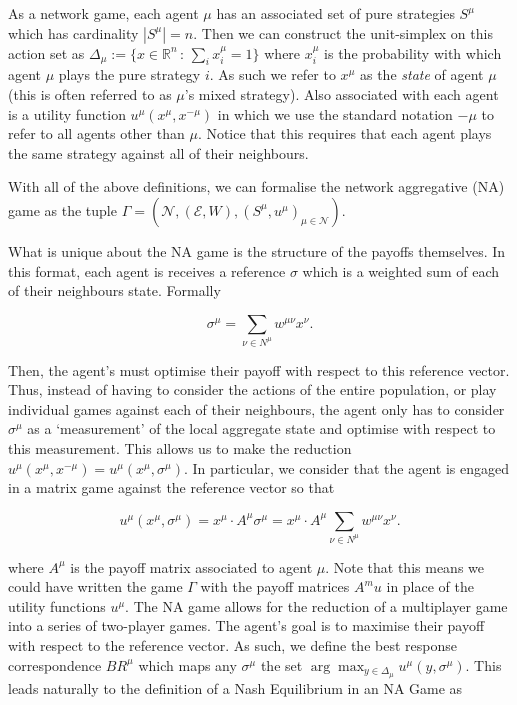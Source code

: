 \documentclass{article}
\theoremstyle{definition}
\newcommand{\agentset}{\mathcal{N}}
\newcommand{\edgeset}{\mathcal{E}}
\newcommand{\weightset}{W}
\newcommand{\actionset}[1]{S^{#1}}
\newcommand{\utility}[1]{u^{#1}}
\newcommand{\wmunu}{w^{\mu \nu}}
\newcommand{\xmu}{x^{\mu}}
\newcommand{\xnu}{x^{\nu}}
\newcommand{\refmu}{\sigma^{\mu}}
\newcommand{\weightedsum}{ \sum_{\nu \in N^\mu} \wmunu \xnu}
\newcommand{\xnotmu}{x^{-\mu}}
\newcommand{\xmuaction}[1]{x^{\mu}_{#1}}
\begin{document}
	As a network game, each agent $\mu$ has an associated set of pure strategies $\actionset{\mu}$
	which has cardinality $|\actionset{\mu}| = n$. Then we can construct the unit-simplex on this
	action set as $\Delta_\mu := \{x \in \mathbb{R}^n \, : \, \sum_i \xmuaction{i} = 1\}$ where
	$\xmuaction{i}$ is the probability with which agent $\mu$ plays the pure strategy $i$. As such
	we refer to $\xmu$ as the \emph{state} of agent $\mu$ (this is often referred to as $\mu$'s
	mixed strategy). Also associated with each agent is a utility function $u^\mu(\xmu, \xnotmu)$ in
	which we use the standard notation $-\mu$ to refer to all agents other than $\mu$. Notice that
	this requires that each agent plays the same strategy against all of their neighbours. 

	With all of the above definitions, we can formalise the network aggregative (NA) game as the tuple
	$\Gamma = (\agentset, (\edgeset, \weightset), (\actionset{\mu}, \utility{\mu})_{\mu \in \mathcal{N}})$.

	What is unique about the NA game is the structure of the payoffs themselves. In this format,
	each agent is receives a reference $\sigma$ which is a weighted sum of each of their
	neighbours state. Formally 

	\begin{equation}
		\sigma^\mu = \sum_{\nu \in N^\mu} \wmunu \xnu.
	\end{equation}

	Then, the agent's must optimise their payoff with respect to this reference vector. Thus,
	instead of having to consider the actions of the entire population, or play individual games
	against each of their neighbours, the agent only has to consider $\sigma^\mu$ as a `measurement'
	of the local aggregate state and optimise with respect to this measurement. This allows us to
	make the reduction $u^\mu(\xmu, \xnotmu) = u^\mu(\xmu, \refmu)$. In particular, we consider that
	the agent is engaged in a matrix game against the reference vector so that

	\begin{equation}
		u^\mu(\xmu, \refmu) = \xmu \cdot A^\mu \refmu = \xmu \cdot A^\mu \weightedsum.
	\end{equation}

	where $A^\mu$ is the payoff matrix associated to agent $\mu$. Note that this means we could have
	written the game $\Gamma$ with the payoff matrices $A^mu$ in place of the utility functions
	$\utility{\mu}$. The NA game allows for the reduction of a
	multiplayer game into a series of two-player games. The agent's goal is to maximise their payoff
	with respect to the reference vector. As such, we define the best response correspondence
	$BR^\mu$ which maps any $\refmu$ the set $\arg \max_{y \in \Delta_\mu} {u^\mu(y, \refmu)}$. This
	leads naturally to the definition of a Nash Equilibrium in an NA Game as
\end{document}
